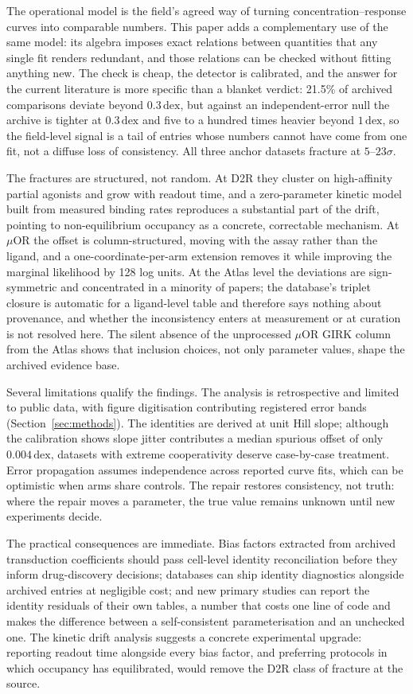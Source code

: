 ﻿\documentclass[11pt,a4paper]{article}
\newcommand{\dex}{\ensuremath{\,\mathrm{dex}}}
\begin{document}
The operational model is the field's agreed way of turning concentration--response curves into comparable numbers. This paper adds a complementary use of the same model: its algebra imposes exact relations between quantities that any single fit renders redundant, and those relations can be checked without fitting anything new. The check is cheap, the detector is calibrated, and the answer for the current literature is more specific than a blanket verdict: 21.5\% of archived comparisons deviate beyond $0.3\dex$, but against an independent-error null the archive is tighter at $0.3\dex$ and five to a hundred times heavier beyond $1\dex$, so the field-level signal is a tail of entries whose numbers cannot have come from one fit, not a diffuse loss of consistency. All three anchor datasets fracture at $5$--$23\sigma$.

The fractures are structured, not random. At D2R they cluster on high-affinity partial agonists and grow with readout time, and a zero-parameter kinetic model built from measured binding rates reproduces a substantial part of the drift, pointing to non-equilibrium occupancy as a concrete, correctable mechanism. At $\mu$OR the offset is column-structured, moving with the assay rather than the ligand, and a one-coordinate-per-arm extension removes it while improving the marginal likelihood by 128 log units. At the Atlas level the deviations are sign-symmetric and concentrated in a minority of papers; the database's triplet closure is automatic for a ligand-level table and therefore says nothing about provenance, and whether the inconsistency enters at measurement or at curation is not resolved here. The silent absence of the unprocessed $\mu$OR GIRK column from the Atlas shows that inclusion choices, not only parameter values, shape the archived evidence base.

Several limitations qualify the findings. The analysis is retrospective and limited to public data, with figure digitisation contributing registered error bands (Section~\ref{sec:methods}). The identities are derived at unit Hill slope; although the calibration shows slope jitter contributes a median spurious offset of only $0.004\dex$, datasets with extreme cooperativity deserve case-by-case treatment. Error propagation assumes independence across reported curve fits, which can be optimistic when arms share controls. The repair restores consistency, not truth: where the repair moves a parameter, the true value remains unknown until new experiments decide.

The practical consequences are immediate. Bias factors extracted from archived transduction coefficients should pass cell-level identity reconciliation before they inform drug-discovery decisions; databases can ship identity diagnostics alongside archived entries at negligible cost; and new primary studies can report the identity residuals of their own tables, a number that costs one line of code and makes the difference between a self-consistent parameterisation and an unchecked one. The kinetic drift analysis suggests a concrete experimental upgrade: reporting readout time alongside every bias factor, and preferring protocols in which occupancy has equilibrated, would remove the D2R class of fracture at the source.
\end{document}
